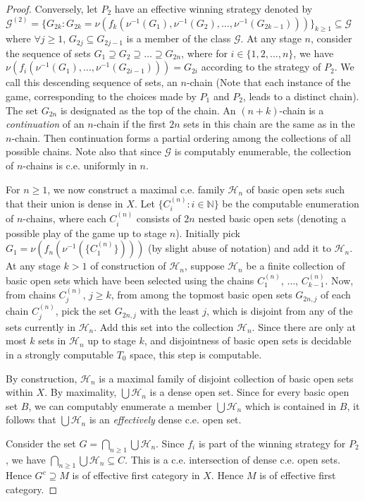 \documentclass[a4paper,UKenglish,autoref,thm-restate,numberwithinsect]{lipics-v2021}
\newcommand{\N}{\mathbb{N}}
\begin{document}
\begin{proof}
	Conversely, let $P_2$ have an effective winning strategy denoted by $\mathcal{G}^{(2)} =\{G_{2k}:G_{2k} = \nu(f_k\left(\nu^{-1}(G_1),\nu^{-1}(G_2), \ldots, \nu^{-1}(G_{2k-1})\right))\}_{k\geq1}\subseteq\mathcal{G}$ where $\forall j\geq1$, $G_{2j}\subseteq G_{2j-1}$ is a member of the class $\mathcal{G}$. At any stage $n$, consider the sequence of sets $G_1 \supseteq G_2 \supseteq \dots \supseteq G_{2n}$, where for $i\in\{1,2,\ldots,n\}$, we have $\nu(f_i\left(\nu^{-1}(G_1),\ldots,\nu^{-1}(G_{2i-1})\right))=G_{2i}$ according to the strategy of $P_2$. We call this descending sequence of sets, an $n$-chain (Note that each instance of the game, corresponding to the choices made by $P_1$ and $P_2$, leads to a distinct chain). The set $G_{2n}$ is designated as the top of the chain. An $(n+k)$-chain is a \emph{continuation} of an $n$-chain if the first $2n$ sets in this chain are the same as in the $n$-chain. Then continuation forms a partial ordering among the collections of all possible chains. Note also that since $\mathcal{G}$ is computably enumerable, the collection of $n$-chains is c.e. uniformly in $n$. 
	
	For $n\ge1$, we now construct a maximal c.e. family $\mathcal{H}_n$ of basic open sets such that their union is dense in $X$. Let $\{C^{(n)}_i: i\in\N\}$ be the computable enumeration of $n$-chains, where each $C^{(n)}_i$ consists of $2n$ nested basic open sets (denoting a possible play of the game up to stage $n$). Initially pick $G_{1}=\nu(f_n(\nu^{-1}(\{C^{(n)}_1\})))$ (by slight abuse of notation) and add it to $\mathcal{H}_n$. At any stage $k> 1$ of construction of $\mathcal{H}_n$, suppose $\mathcal{H}_n$ be a finite collection of basic open sets which have been selected using the chains $C^{(n)}_1$, $\dots$, $C^{(n)}_{k-1}$. Now, from chains $C^{(n)}_j$, $j\geq k$, from among the topmost basic open sets $G_{2n,j}$ of each chain $C_j^{(n)}$, pick the set $G_{2n,j}$ with the least $j$, which is disjoint from any of the sets currently in $\mathcal{H}_n$. Add this set into the collection $\mathcal{H}_n$. Since there are only at most $k$ sets in $\mathcal{H}_n$ up to stage $k$, and disjointness of basic open sets is decidable in a strongly computable $T_0$ space, this step is computable. 
	
	By construction, $\mathcal{H}_n$ is a maximal family of disjoint collection of basic open sets within $X$. By maximality, $\bigcup\mathcal{H}_n$ is a dense open set. Since for every basic open set $B$, we can computably enumerate a member $\bigcup\mathcal{H}_n$ which is contained in $B$, it follows that $\bigcup\mathcal{H}_n$ is an \emph{effectively} dense c.e. open set. 
	
	Consider the set $G=\bigcap_{n\geq1}\bigcup\mathcal{H}_n$. Since $f_i$ is part of the winning strategy for $P_2$, we have $\bigcap_{n\geq1}\bigcup\mathcal{H}_n \subseteq C$. This is a c.e. intersection of dense c.e. open sets. Hence $G^c\supseteq M$ is of effective first category in $X$. Hence $M$ is of effective first category. 
\end{proof}
\end{document}

